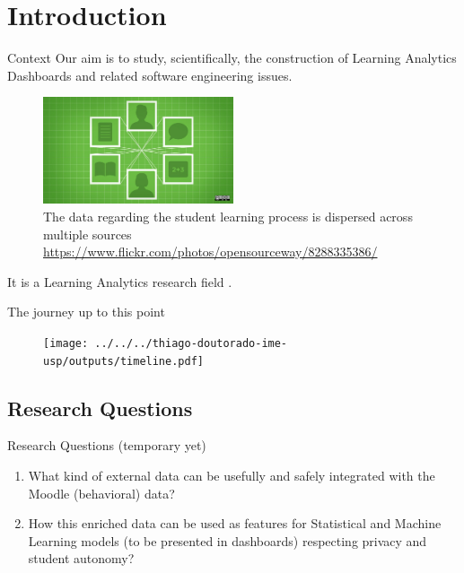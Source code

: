 \section{Introduction}

\begin{frame}{Context}
    Our aim is to study, scientifically, the construction of Learning Analytics Dashboards and related software engineering issues.

    \begin{figure}[H]
        \centering
        \label{fig:digital_learning}
        \includegraphics[width=0.5\textwidth]{../../images/digital_learning.jpg}
        \\ \small The data regarding the student learning process is dispersed across multiple sources
        \\ \small \url{https://www.flickr.com/photos/opensourceway/8288335386/}
    \end{figure}

    It is a Learning Analytics research field \cite{lang2017handbook}.
\end{frame}


\begin{frame}{The journey up to this point}
    \begin{figure}[H]
        \centering
        \texttt{[image: ../../../thiago-doutorado-ime-usp/outputs/timeline.pdf]}
    \end{figure}
\end{frame}

\subsection{Research Questions}
\begin{frame}{Research Questions (temporary yet)}
    \begin{enumerate}[<+-|alert@+>]\color{gray}
        \item What kind of external data can be usefully and safely integrated with 
              the Moodle (behavioral) data?
        \item How this enriched data can be used as features for Statistical and 
              Machine Learning models (to be presented in dashboards) respecting privacy and student autonomy?
    \end{enumerate}
\end{frame}

